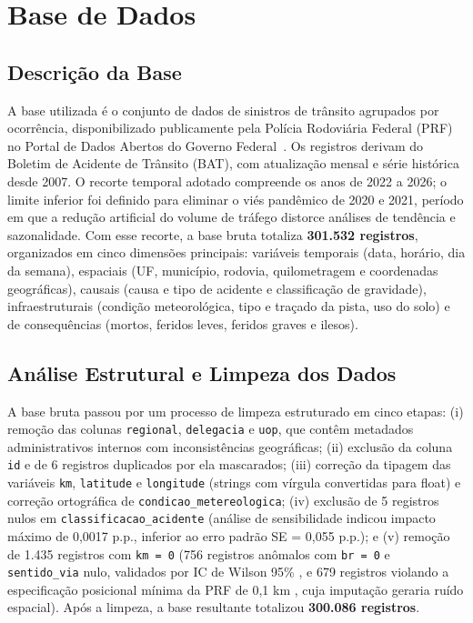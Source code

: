 \documentclass[12pt]{article}
\begin{document}
\section{Base de Dados}

\subsection{Descrição da Base}

A base utilizada é o conjunto de dados de sinistros de trânsito
agrupados por ocorrência, disponibilizado publicamente pela Polícia
Rodoviária Federal (PRF) no Portal de Dados Abertos do Governo
Federal~\cite{prf:2024}. Os registros derivam do Boletim de Acidente
de Trânsito (BAT), com atualização mensal e série histórica desde
2007. O recorte temporal adotado compreende os anos de 2022 a 2026;
o limite inferior foi definido para eliminar o viés pandêmico de 2020
e 2021, período em que a redução artificial do volume de tráfego
distorce análises de tendência e sazonalidade. Com esse recorte, a
base bruta totaliza \textbf{301.532 registros}, organizados em cinco
dimensões principais: variáveis temporais (data, horário, dia da
semana), espaciais (UF, município, rodovia, quilometragem e
coordenadas geográficas), causais (causa e tipo de acidente e
classificação de gravidade), infraestruturais (condição
meteorológica, tipo e traçado da pista, uso do solo) e de
consequências (mortos, feridos leves, feridos graves e ilesos).

\subsection{Análise Estrutural e Limpeza dos Dados}

A base bruta passou por um processo de limpeza estruturado em cinco etapas: (i) remoção das colunas \texttt{regional}, \texttt{delegacia} e \texttt{uop}, que contêm metadados administrativos internos com inconsistências geográficas; (ii) exclusão da coluna \texttt{id} e de 6 registros duplicados por ela mascarados; (iii) correção da tipagem das variáveis \texttt{km}, \texttt{latitude} e \texttt{longitude} (strings com vírgula convertidas para float) e correção ortográfica de \texttt{condicao\_metereologica}; (iv) exclusão de 5 registros nulos em \texttt{classificacao\_acidente} (análise de sensibilidade indicou impacto máximo de 0,0017 p.p., inferior ao erro padrão SE = 0,055 p.p.); e (v) remoção de 1.435 registros com \texttt{km = 0} (756 registros anômalos com \texttt{br = 0} e \texttt{sentido\_via} nulo, validados por IC de Wilson 95\% \cite{wilson:1927}, e 679 registros violando a especificação posicional mínima da PRF de 0,1 km \cite{prf:dicionario}, cuja imputação geraria ruído espacial). Após a limpeza, a base resultante totalizou \textbf{300.086 registros}.
\end{document}
